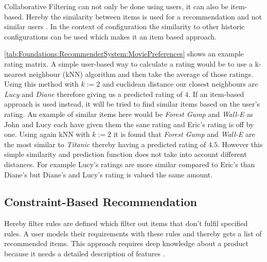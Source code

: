 Collaborative Filtering can not only be done using users, it can also be item-based. Hereby the similarity between items is used for a recommendation and not similar users \cite{ricciRecommenderSystemsHandbook2015}. In the context of configuration the similarity to other historic configurations can be used which makes it an item based approach. 

\autoref{tab:Foundations:RecommenderSystem:MoviePreferences} shows an example rating matrix. A simple user-based way to calculate a rating would be to use a k-nearest neighbour (kNN) algorithm and then take the average of those ratings. Using this method with $k := 2$ and euclidean distance our closest neighbours are \textit{Lucy} and \textit{Diane} therefore giving us a predicted rating of $4$. If an item-based approach is used instead, it will be tried to find similar items based on the user's rating. An example of similar items here would be \textit{Forest Gump} and \textit{Wall-E} as John and Lucy each have given them the sane rating and Eric's rating is off by one. Using again kNN with $k := 2$ it is found that \textit{Forest Gump} and \textit{Wall-E} are the most similar to \textit{Titanic} thereby having a predicted rating of $4.5$.
However this simple similarity and prediction function does not take into account different distances. For example Lucy's ratings are more similar compared to Eric's than Diane's but Diane's and Lucy's rating is valued the same amount.


\subsection{Constraint-Based Recommendation}
Hereby filter rules are defined which filter out items that don't fulfil specified rules. A user models their requirements with these rules and thereby gets a list of recommended items. This approach requires deep knowledge about a product because it needs a detailed description of features  \cite[~ p. 12]{felfernigDecisionTasksBasic2018}.

